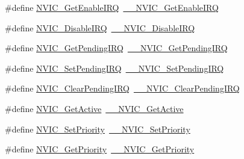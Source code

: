 \begin{DoxyCompactItemize}
\#define \hyperlink{group___c_m_s_i_s___core___n_v_i_c_functions_ga857de13232ec65dd15087eaa15bc4a69}{N\+V\+I\+C\+\_\+\+Get\+Enable\+I\+RQ}~\hyperlink{group___c_m_s_i_s___core___n_v_i_c_functions_gaaeb5e7cc0eaad4e2817272e7bf742083}{\+\_\+\+\_\+\+N\+V\+I\+C\+\_\+\+Get\+Enable\+I\+RQ}
\item 
\#define \hyperlink{group___c_m_s_i_s___core___n_v_i_c_functions_ga73b4e251f59cab4e9a5e234aac02ae57}{N\+V\+I\+C\+\_\+\+Disable\+I\+RQ}~\hyperlink{group___c_m_s_i_s___core___n_v_i_c_functions_gae016e4c1986312044ee768806537d52f}{\+\_\+\+\_\+\+N\+V\+I\+C\+\_\+\+Disable\+I\+RQ}
\item 
\#define \hyperlink{group___c_m_s_i_s___core___n_v_i_c_functions_gac608957a239466e9e0cbc30aa64feb3b}{N\+V\+I\+C\+\_\+\+Get\+Pending\+I\+RQ}~\hyperlink{group___c_m_s_i_s___core___n_v_i_c_functions_ga5a92ca5fa801ad7adb92be7257ab9694}{\+\_\+\+\_\+\+N\+V\+I\+C\+\_\+\+Get\+Pending\+I\+RQ}
\item 
\#define \hyperlink{group___c_m_s_i_s___core___n_v_i_c_functions_ga2b47e2e52cf5c48a5c3348636434b3ac}{N\+V\+I\+C\+\_\+\+Set\+Pending\+I\+RQ}~\hyperlink{group___c_m_s_i_s___core___n_v_i_c_functions_gaabefdd4b790b9a7308929938c0c1e1ad}{\+\_\+\+\_\+\+N\+V\+I\+C\+\_\+\+Set\+Pending\+I\+RQ}
\item 
\#define \hyperlink{group___c_m_s_i_s___core___n_v_i_c_functions_ga590cf113000a079b1f0ea3dcd5b5316c}{N\+V\+I\+C\+\_\+\+Clear\+Pending\+I\+RQ}~\hyperlink{group___c_m_s_i_s___core___n_v_i_c_functions_ga562a86dbdf14827d0fee8fdafb04d191}{\+\_\+\+\_\+\+N\+V\+I\+C\+\_\+\+Clear\+Pending\+I\+RQ}
\item 
\#define \hyperlink{group___c_m_s_i_s___core___n_v_i_c_functions_ga58ad3f352f832235ab3b192ff4745320}{N\+V\+I\+C\+\_\+\+Get\+Active}~\hyperlink{group___c_m_s_i_s___core___n_v_i_c_functions_gaa2837003c28c45abf193fe5e8d27f593}{\+\_\+\+\_\+\+N\+V\+I\+C\+\_\+\+Get\+Active}
\item 
\#define \hyperlink{group___c_m_s_i_s___core___n_v_i_c_functions_gae0e9d0e2f7b6133828c71b57d4941c35}{N\+V\+I\+C\+\_\+\+Set\+Priority}~\hyperlink{group___c_m_s_i_s___core___n_v_i_c_functions_ga505338e23563a9c074910fb14e7d45fd}{\+\_\+\+\_\+\+N\+V\+I\+C\+\_\+\+Set\+Priority}
\item 
\#define \hyperlink{group___c_m_s_i_s___core___n_v_i_c_functions_gaf59b9d0a791d2157abb319753953eceb}{N\+V\+I\+C\+\_\+\+Get\+Priority}~\hyperlink{group___c_m_s_i_s___core___n_v_i_c_functions_gaeb9dc99c8e7700668813144261b0bc73}{\+\_\+\+\_\+\+N\+V\+I\+C\+\_\+\+Get\+Priority}
\item 

\end{DoxyCompactItemize}
